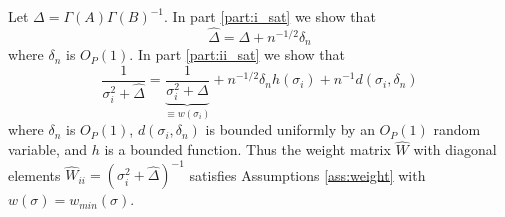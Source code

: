 \documentclass[ejs,ps,preprint]{imsart}
\numberwithin{equation}{section}
\theoremstyle{plain}
\begin{document}
Let $\Delta = \Gamma(A)\Gamma(B)^{-1}$. In part \ref{part:i_sat} we show that
\begin{equation*}
\widehat{\Delta} = \Delta + n^{-1/2}\delta_n
\end{equation*}
where $\delta_n$ is $O_P(1)$. In part \ref{part:ii_sat} we show that
\begin{equation*}
\frac{1}{\sigma_i^2 + \widehat{\Delta}} = \underbrace{\frac{1}{\sigma_i^2 + \Delta}}_{\equiv w(\sigma_i)} + n^{-1/2} \delta_n h(\sigma_i) + n^{-1}d(\sigma_i,\delta_n)
\end{equation*}
where $\delta_n$ is $O_P(1)$, $d(\sigma_i,\delta_n)$ is bounded uniformly by an $O_P(1)$ random variable, and $h$ is a bounded function. Thus the weight matrix $\widehat{W}$ with diagonal elements $\widehat{W}_{ii} = (\sigma_i^2 + \widehat{\Delta})^{-1}$ satisfies Assumptions \ref{ass:weight} with $w(\sigma) = w_{min}(\sigma)$.
\end{document}
